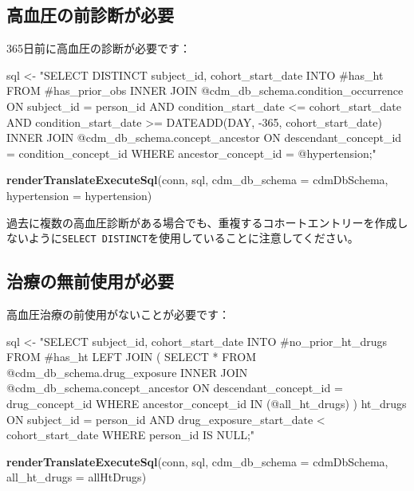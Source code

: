 \documentclass[
  11pt]{book}
\newenvironment{Shaded}{\begin{snugshade}}{\end{snugshade}}
\newcommand{\AttributeTok}[1]{\textcolor[rgb]{0.13,0.29,0.53}{#1}}
\newcommand{\FunctionTok}[1]{\textcolor[rgb]{0.13,0.29,0.53}{\textbf{#1}}}
\newcommand{\NormalTok}[1]{#1}
\newcommand{\OtherTok}[1]{\textcolor[rgb]{0.56,0.35,0.01}{#1}}
\newcommand{\StringTok}[1]{\textcolor[rgb]{0.31,0.60,0.02}{#1}}
\theoremstyle{definition}
\theoremstyle{definition}
\theoremstyle{definition}
\theoremstyle{definition}
\theoremstyle{remark}
\begin{document}
\subsection{高血圧の前診断が必要}\label{ux9ad8ux8840ux5727ux306eux524dux8a3aux65adux304cux5fc5ux8981}

365日前に高血圧の診断が必要です：

\begin{Shaded}
\begin{Highlighting}[]
\NormalTok{sql }\OtherTok{\textless{}{-}} \StringTok{"SELECT DISTINCT subject\_id,}
\StringTok{  cohort\_start\_date}
\StringTok{INTO \#has\_ht}
\StringTok{FROM \#has\_prior\_obs}
\StringTok{INNER JOIN @cdm\_db\_schema.condition\_occurrence}
\StringTok{  ON subject\_id = person\_id}
\StringTok{    AND condition\_start\_date \textless{}= cohort\_start\_date}
\StringTok{    AND condition\_start\_date \textgreater{}= DATEADD(DAY, {-}365, cohort\_start\_date)}
\StringTok{INNER JOIN @cdm\_db\_schema.concept\_ancestor}
\StringTok{  ON descendant\_concept\_id = condition\_concept\_id}
\StringTok{WHERE ancestor\_concept\_id = @hypertension;"}

\FunctionTok{renderTranslateExecuteSql}\NormalTok{(conn,}
\NormalTok{                          sql,}
                          \AttributeTok{cdm\_db\_schema =}\NormalTok{ cdmDbSchema,}
                          \AttributeTok{hypertension =}\NormalTok{ hypertension)}
\end{Highlighting}
\end{Shaded}

過去に複数の高血圧診断がある場合でも、重複するコホートエントリーを作成しないように\texttt{SELECT\ DISTINCT}を使用していることに注意してください。

\subsection{治療の無前使用が必要}\label{ux6cbbux7642ux306eux7121ux524dux4f7fux7528ux304cux5fc5ux8981}

高血圧治療の前使用がないことが必要です：

\begin{Shaded}
\begin{Highlighting}[]
\NormalTok{sql }\OtherTok{\textless{}{-}} \StringTok{"SELECT subject\_id,}
\StringTok{  cohort\_start\_date}
\StringTok{INTO \#no\_prior\_ht\_drugs}
\StringTok{FROM \#has\_ht}
\StringTok{LEFT JOIN (}
\StringTok{  SELECT *}
\StringTok{  FROM @cdm\_db\_schema.drug\_exposure}
\StringTok{  INNER JOIN @cdm\_db\_schema.concept\_ancestor}
\StringTok{    ON descendant\_concept\_id = drug\_concept\_id}
\StringTok{  WHERE ancestor\_concept\_id IN (@all\_ht\_drugs)}
\StringTok{) ht\_drugs}
\StringTok{  ON subject\_id = person\_id}
\StringTok{    AND drug\_exposure\_start\_date \textless{} cohort\_start\_date}
\StringTok{WHERE person\_id IS NULL;"}

\FunctionTok{renderTranslateExecuteSql}\NormalTok{(conn,}
\NormalTok{                          sql,}
                          \AttributeTok{cdm\_db\_schema =}\NormalTok{ cdmDbSchema,}
                          \AttributeTok{all\_ht\_drugs =}\NormalTok{ allHtDrugs)}
\end{Highlighting}
\end{Shaded}
\end{document}
